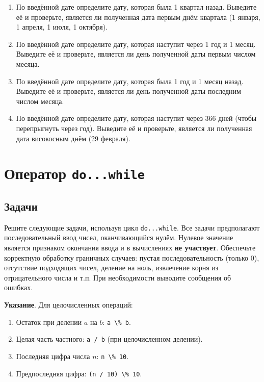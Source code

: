 \documentclass[12pt]{article}
\begin{document}
\begin{enumerate}
    \item По введённой дате определите дату, которая была 1 квартал назад. Выведите её и проверьте, является ли полученная дата первым днём квартала (1 января, 1 апреля, 1 июля, 1 октября).
    \item По введённой дате определите дату, которая наступит через 1 год и 1 месяц. Выведите её и проверьте, является ли день полученной даты первым числом месяца.
    \item По введённой дате определите дату, которая была 1 год и 1 месяц назад. Выведите её и проверьте, является ли день полученной даты последним числом месяца.
    \item По введённой дате определите дату, которая наступит через 366 дней (чтобы перепрыгнуть через год). Выведите её и проверьте, является ли полученная дата високосным днём (29 февраля).
\end{enumerate}

\section{Оператор \texttt{do...while}}

\subsection*{Задачи}

Решите следующие задачи, используя цикл \texttt{do...while}. Все задачи предполагают последовательный ввод чисел, оканчивающийся нулём. Нулевое значение является признаком окончания ввода и в вычислениях \textbf{не участвует}. Обеспечьте корректную обработку граничных случаев: пустая последовательность (только 0), отсутствие подходящих чисел, деление на ноль, извлечение корня из отрицательного числа и т.п. При необходимости выводите сообщения об ошибках.

\textbf{Указание}. Для целочисленных операций:
\begin{enumerate}
\item Остаток при делении $a$ на $b$: \verb|a \% b|.
    \item Целая часть частного: \verb|a / b| (при целочисленном делении).
    \item Последняя цифра числа $n$: \verb|n \% 10|.
    \item Предпоследняя цифра: \verb|(n / 10) \% 10|.
\end{enumerate}
\end{document}
